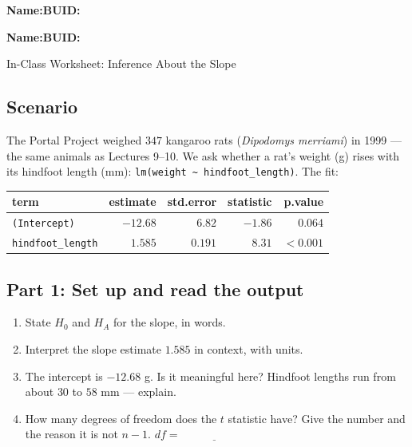 \documentclass{article}
\newcommand{\blankline}[1]{\underline{\hspace{#1}}}
\begin{document}
\noindent\textbf{Name:}\blankline{2.25in}\hfill\textbf{BUID:}\blankline{1.55in}

\medskip

\noindent\textbf{Name:}\blankline{2.25in}\hfill\textbf{BUID:}\blankline{1.55in}\newline

\begin{center}
 \Large In-Class Worksheet: Inference About the Slope
\end{center}

\subsection*{Scenario}
The Portal Project weighed $347$ kangaroo rats (\emph{Dipodomys merriami}) in 1999 --- the same animals as Lectures 9--10. We ask whether a rat's weight (g) rises with its hindfoot length (mm): \texttt{lm(weight \textasciitilde{} hindfoot\_length)}. The fit:

\begin{center}
\renewcommand{\arraystretch}{1.3}
\begin{tabular}{lrrrr}
\toprule
term & estimate & std.error & statistic & p.value \\
\midrule
\texttt{(Intercept)}     & $-12.68$ & $6.82$ & $-1.86$ & $0.064$ \\
\texttt{hindfoot\_length} & $1.585$  & $0.191$ & $8.31$ & $<0.001$ \\
\bottomrule
\end{tabular}
\end{center}

\newpage

\subsection*{Part 1: Set up and read the output}

\begin{enumerate}[label={\bfseries (\Alph*)},itemsep=.8em]
\item State $H_0$ and $H_A$ for the slope, in words. \\[3em]
\item Interpret the slope estimate $1.585$ in context, with units. \\[3em]
\item The intercept is $-12.68$ g. Is it meaningful here? Hindfoot lengths run from about $30$ to $58$ mm --- explain. \\[3em]
\item How many degrees of freedom does the $t$ statistic have? Give the number and the reason it is not $n-1$. \hfill $df = \blankline{1in}$ \\[1.5em]
\end{enumerate}
\end{document}
